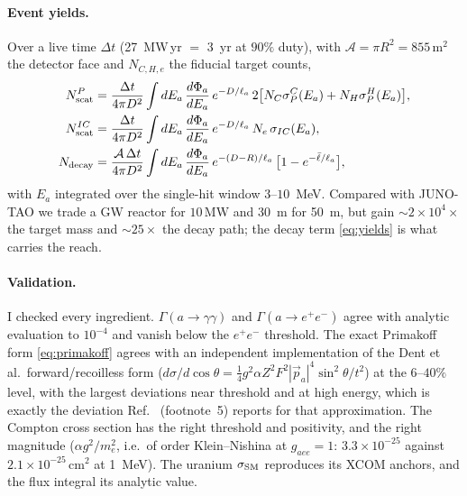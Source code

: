 \documentclass[aps,prd,superscriptaddress,nofootinbib,longbibliography,notitlepage,11pt]{revtex4-2}
\begin{document}
\paragraph{Event yields.}
Over a live time $\Delta t$ (27~MW\,yr $=$ 3~yr at $90\%$ duty), with $\mathcal A=\pi R^2=
855\,\mathrm{m^2}$ the detector face and $N_{C,H,e}$ the fiducial target counts,
\begin{align}
N_{\rm scat}^{P}&=\frac{\Delta t}{4\pi D^2}\int dE_a\,\frac{d\Phi_a}{dE_a}\,e^{-D/\ell_a}\,
2\big[N_C\sigma_P^{C}(E_a)+N_H\sigma_P^{H}(E_a)\big],\\
N_{\rm scat}^{IC}&=\frac{\Delta t}{4\pi D^2}\int dE_a\,\frac{d\Phi_a}{dE_a}\,e^{-D/\ell_a}\,
N_e\,\sigma_{IC}(E_a),\\
N_{\rm decay}&=\frac{\mathcal A\,\Delta t}{4\pi D^2}\int dE_a\,\frac{d\Phi_a}{dE_a}\,
e^{-(D-R)/\ell_a}\,\big[1-e^{-\bar\ell/\ell_a}\big],
\label{eq:yields}
\end{align}
with $E_a$ integrated over the single-hit window $3$--$10$~MeV.  Compared with JUNO-TAO we
trade a GW reactor for $10\,\mathrm{MW}$ and 30~m for 50~m, but gain $\sim2\times10^4\times$
the target mass and $\sim25\times$ the decay path; the decay term \eqref{eq:yields} is what
carries the reach.

\paragraph{Validation.}
I checked every ingredient.  $\Gamma(a\to\gamma\gamma)$ and $\Gamma(a\to e^+e^-)$ agree with
analytic evaluation to $10^{-4}$ and vanish below the $e^+e^-$ threshold.  The exact
Primakoff form \eqref{eq:primakoff} agrees with an independent implementation of the Dent
et al.\ forward/recoilless form ($d\sigma/d\cos\theta=\tfrac14g^2\alpha Z^2F^2|\vec p_a|^4
\sin^2\theta/t^2$) at the $6$--$40\%$ level, with the largest deviations near threshold and at
high energy, which is exactly the deviation Ref.~\cite{AristizabalSierra:2020rom}
(footnote~5) reports for that approximation.  The Compton cross section has the right
threshold and positivity, and the right magnitude ($\alpha g^2/m_e^2$, i.e.\ of order
Klein--Nishina at $g_{aee}=1$: $3.3\times10^{-25}$ against
$2.1\times10^{-25}\,\mathrm{cm^2}$ at 1~MeV).  The uranium $\sigma_{\rm SM}$ reproduces its
XCOM anchors, and the flux integral its analytic value.
\end{document}

